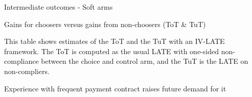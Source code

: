 \documentclass[oneside,11pt]{article}
\begin{document}
\begin{landscape}

\begin{table}[H]
\caption{Intermediate outcomes - Soft arms}
\label{mechanisms_soft}
\begin{center}
\scriptsize{}
\end{center}

\end{table}

\end{landscape}

\cleardoublepage

\begin{landscape}

\begin{table}[H]
\caption{Gains for choosers versus gains from non-choosers (ToT \& TuT)}
\label{tot_tut}
\begin{center}
\scriptsize{}
\end{center}
 \scriptsize This table shows estimates of the ToT and the TuT with an IV-LATE framework. The ToT is computed as the usual LATE with one-sided non-compliance between the choice and control arm, and the TuT is the LATE on non-compliers. 
\end{table}

\end{landscape}


\begin{table}[H]
\caption{Experience with frequent payment contract raises future demand for it}
\label{learning_not_doing}
\begin{center}
\scriptsize{}
\end{center}
 \scriptsize 
\end{table}




\end{document}
